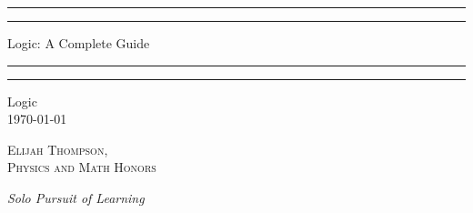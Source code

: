 \documentclass[12pt, a4paper, oneside, openright, titlepage]{book}
\begin{document}

\begin{titlepage}
    \centering
    \scshape
    \vspace*{\baselineskip}
    \rule{\textwidth}{1.6pt}\vspace*{-\baselineskip}\vspace*{2pt}
    \rule{\textwidth}{0.4pt}
    
    \vspace{0.75\baselineskip}
    
    {\LARGE Logic: A Complete Guide}
    
    \vspace{0.75\baselineskip}
    
    \rule{\textwidth}{0.4pt}\vspace*{-\baselineskip}\vspace{3.2pt}
    \rule{\textwidth}{1.6pt}
    
    \vspace{2\baselineskip}
    Logic \\
    \vspace*{3\baselineskip}
    \monthdayyeardate\today \\
    \vspace*{5.0\baselineskip}
    
    {\scshape\Large Elijah Thompson, \\ Physics and Math Honors\\}
    
    \vspace{1.0\baselineskip}
    \textit{Solo Pursuit of Learning}
    \vfill
    \enlargethispage{1in}
    \begin{figure}[b!]
    \end{figure}
\end{titlepage}
\end{document}
